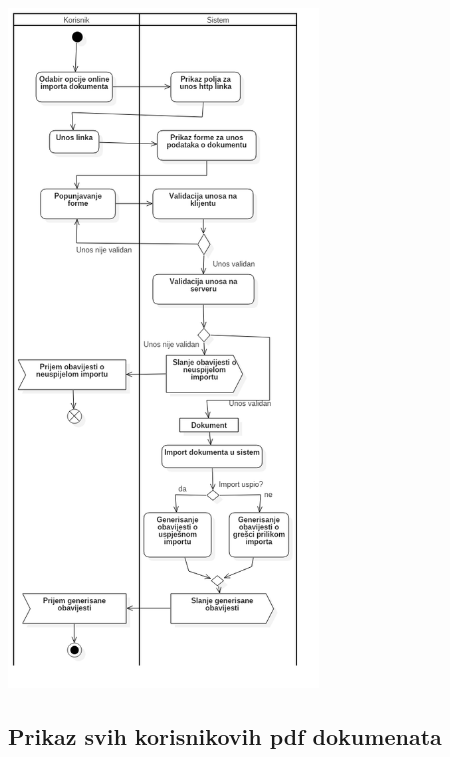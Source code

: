 \begin{center}
    \includegraphics[height=18cm]{images/ImportOnlineDokumenata.png}
\end{center}

\subsection{Prikaz svih korisnikovih pdf dokumenata}


